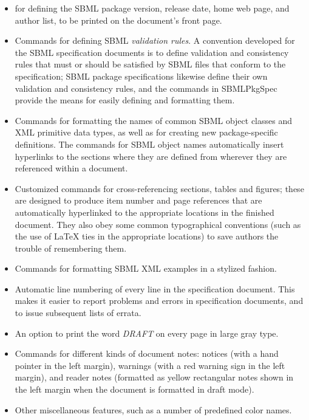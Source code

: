 \documentclass{bmcart}
\newcommand{\sbmlpkg}{SBMLPkgSpec}
\providecommand{\DIFaddtex}[1]{\protect\cbstart{#1}\protect\cbend} %
\providecommand{\DIFdeltex}[1]{\protect\cbdelete} %
\providecommand{\DIFaddbegin}{} %
\providecommand{\DIFaddend}{} %
\providecommand{\DIFdelbegin}{} %
\providecommand{\DIFdelend}{} %
\providecommand{\DIFadd}[1]{\texorpdfstring{\DIFaddtex{#1}}{#1}} %
\providecommand{\DIFdel}[1]{\texorpdfstring{\DIFdeltex{#1}}{}} %
\newcommand{\DIFscaledelfig}{0.5}
\newlength{\DIFdelgraphicswidth} %
\newlength{\DIFdelgraphicsheight} %
\newcommand{\DIFaddincludegraphics}[2][]{{\color{blue}\fbox{\DIFOincludegraphics[#1]{#2}}}} %
\newcommand{\DIFdelincludegraphics}[2][]{%
\sbox{\DIFdelgraphicsbox}{\DIFOincludegraphics[#1]{#2}}%
\settoboxwidth{\DIFdelgraphicswidth}{\DIFdelgraphicsbox} %
\settoboxtotalheight{\DIFdelgraphicsheight}{\DIFdelgraphicsbox} %
\scalebox{\DIFscaledelfig}{%
\parbox[b]{\DIFdelgraphicswidth}{\usebox{\DIFdelgraphicsbox}\\[-\baselineskip] \rule{\DIFdelgraphicswidth}{0em}}\llap{\resizebox{\DIFdelgraphicswidth}{\DIFdelgraphicsheight}{%
\setlength{\unitlength}{\DIFdelgraphicswidth}%
\begin{picture}(1,1)%
\thicklines\linethickness{2pt} %
{\color[rgb]{1,0,0}\put(0,0){\framebox(1,1){}}}%
{\color[rgb]{1,0,0}\put(0,0){\line( 1,1){1}}}%
{\color[rgb]{1,0,0}\put(0,1){\line(1,-1){1}}}%
\end{picture}%
}\hspace*{3pt}}} %
} %
\DeclareRobustCommand{\DIFaddbegin}{\DIFOaddbegin \let\includegraphics\DIFaddincludegraphics} %
\DeclareRobustCommand{\DIFaddend}{\DIFOaddend \let\includegraphics\DIFOincludegraphics} %
\DeclareRobustCommand{\DIFdelbegin}{\DIFOdelbegin \let\includegraphics\DIFdelincludegraphics} %
\DeclareRobustCommand{\DIFdelend}{\DIFOaddend \let\includegraphics\DIFOincludegraphics} %
\begin{document}
\begin{itemize}

\item \DIFdelbegin \DIFdel{Predefined commands }\DIFdelend \DIFaddbegin \DIFadd{Commands }\DIFaddend for defining the SBML package version, release date, home web page, and author list, to be printed on the document's front page.

\item Commands for defining SBML \emph{validation rules}.  A convention developed for the SBML specification documents is to define validation and consistency rules that must or should be satisfied by SBML files that conform to the specification; SBML package specifications likewise define their own validation and consistency rules, and the commands in \sbmlpkg{} provide the means for easily defining and formatting them.

\item Commands for formatting the names of common SBML object classes and XML primitive data types, as well as for creating new package-specific definitions.  The commands for SBML object names automatically insert hyperlinks to the sections where they are defined from wherever they are  referenced within a document.

\item Customized commands for cross-referencing sections, tables and figures; these are designed to produce \DIFdelbegin \DIFdel{\emph{both} }\DIFdelend \DIFaddbegin \DIFadd{both }\DIFaddend item number and page references that are automatically hyperlinked to the appropriate locations in the finished document. They also obey some common typographical conventions (such as the use of LaTeX ties in the appropriate locations) to save authors the trouble of remembering \DIFaddbegin \DIFadd{to use }\DIFaddend them.

\item Commands for formatting SBML XML examples in a stylized fashion.

\item Automatic line numbering of every line in the specification document. This makes it easier to report problems and errors in specification documents, and to issue subsequent lists of errata.

\item An option to print the word \emph{DRAFT} on every page in large gray type.

\item Commands for different kinds of document notes: notices (with a hand pointer in the left margin), warnings (with a red warning sign in the left margin), and reader notes (formatted as yellow rectangular notes shown in the left margin when the document is formatted in draft mode).

\item Other miscellaneous features, such as a number of predefined color names.

\end{itemize}
\end{document}
